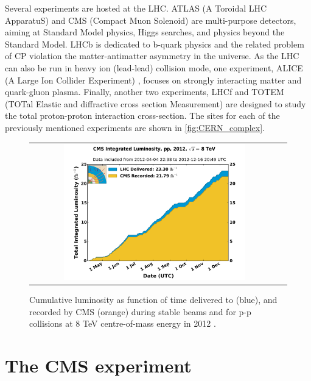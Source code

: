 Several experiments are hosted at the LHC. ATLAS (A Toroidal LHC ApparatuS) \cite{det::ATLAS} and CMS (Compact Muon Solenoid) \cite{Chatrchyan:2008zzk} are multi-purpose detectors, aiming at Standard Model physics, Higgs searches, and physics beyond the Standard Model. LHCb \cite{det::LHCb} is dedicated to b-quark physics and the related problem of CP violation the matter-antimatter asymmetry in the universe. As the LHC can also be run in heavy ion (lead-lead) collision mode, one experiment, ALICE (A Large Ion Collider Experiment) \cite{det::ALICE}, focuses on strongly interacting matter and quark-gluon plasma. Finally, another two experiments, LHCf \cite{Adriani:2008zz} and TOTEM (TOTal Elastic and diffractive cross section Measurement) \cite{Anelli:2008zza} are designed to study the total proton-proton interaction cross-section. The sites for each of the previously mentioned experiments are shown in \autoref{fig:CERN_complex}. 

\begin{figure}[tbh!]
	\centering
	\begin{tabular}{cc}
		\includegraphics[width=0.75\textwidth]{detector/pics/int_lumi_per_day_cumulative_pp_2012.pdf}
	\end{tabular}
	\caption{Cumulative luminosity as function of time delivered to (blue), and recorded by CMS (orange) during stable beams and for p-p collisions at 8 TeV centre-of-mass energy in 2012 \cite{CMS:LumiPublicResults}.}
	\label{fig:lumi_2012}
\end{figure}

\clearpage

\section{The CMS experiment}

